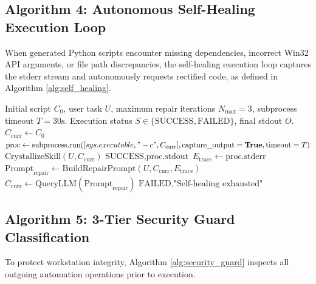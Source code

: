 \subsection{Algorithm 4: Autonomous Self-Healing Execution Loop}
When generated Python scripts encounter missing dependencies, incorrect Win32 API arguments, or file path discrepancies, the self-healing execution loop captures the stderr stream and autonomously requests rectified code, as defined in Algorithm \ref{alg:self_healing}.

\begin{algorithm}[htbp]
\caption{Autonomous Self-Healing Execution Loop}
\label{alg:self_healing}
\begin{algorithmic}[1]
\Require Initial script $C_0$, user task $U$, maximum repair iterations $N_{\text{max}} = 3$, subprocess timeout $T = 30\text{s}$.
\Ensure Execution status $S \in \{\text{SUCCESS}, \text{FAILED}\}$, final stdout $O$.
\State $C_{\text{curr}} \gets C_0$
    \State $\text{proc} \gets \text{subprocess.run}([sys.executable, "-c", C_{\text{curr}}], \text{capture\_output}=\textbf{True}, \text{timeout}=T)$
        \State $\text{CrystallizeSkill}(U, C_{\text{curr}})$ 
        \State \Return $\text{SUCCESS}, \text{proc.stdout}$
    \Else
        \State $E_{\text{trace}} \gets \text{proc.stderr}$
        \State $\text{Prompt}_{\text{repair}} \gets \text{BuildRepairPrompt}(U, C_{\text{curr}}, E_{\text{trace}})$
        \State $C_{\text{curr}} \gets \text{QueryLLM}(\text{Prompt}_{\text{repair}})$
    \EndIf
\EndFor
\State \Return $\text{FAILED}, \text{"Self-healing exhausted"}$
\end{algorithmic}
\end{algorithm}

\subsection{Algorithm 5: 3-Tier Security Guard Classification}
To protect workstation integrity, Algorithm \ref{alg:security_guard} inspects all outgoing automation operations prior to execution.

